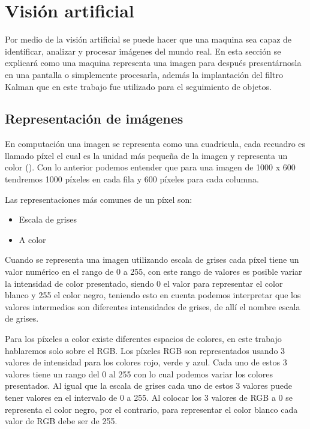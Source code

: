 \section{Visión artificial}

Por medio de la visión artificial se puede hacer que una maquina sea capaz de identificar, analizar y procesar imágenes del mundo real. En esta sección se explicará como una maquina representa una imagen para después presentárnosla en una pantalla o simplemente procesarla, además la implantación del filtro Kalman que en este trabajo fue utilizado para el seguimiento de objetos.

\subsection{Representación de imágenes}

En computación una imagen se representa como una cuadricula, cada recuadro es llamado píxel el cual es la unidad más pequeña de la imagen y representa un color (\cite{rosebrock2017deep}). Con lo anterior podemos entender que para una imagen de 1000 x 600 tendremos 1000 píxeles en cada fila y 600 píxeles para cada columna.

Las representaciones más comunes de un píxel son:

\begin{itemize}
\item Escala de grises
\item A color
\end{itemize}


Cuando se representa una imagen utilizando escala de grises cada píxel tiene un valor numérico en el rango de 0 a 255, con este rango de valores es posible variar la intensidad de color presentado, siendo 0 el valor para representar el color blanco y 255 el color negro, teniendo esto en cuenta podemos interpretar que los valores intermedios son diferentes intensidades de grises, de allí el nombre escala de grises.

Para los píxeles a color existe diferentes espacios de colores, en este trabajo hablaremos solo sobre el RGB. Los píxeles RGB son representados usando 3 valores de intensidad para los colores rojo, verde y azul. Cada uno de estos 3 valores tiene un rango del 0 al 255 con lo cual podemos variar los colores presentados. Al igual que la escala de grises cada uno de estos 3 valores puede tener valores en el intervalo de 0 a 255. Al colocar los 3 valores de RGB a 0 se representa el color negro, por el contrario, para representar el color blanco cada valor de RGB debe ser de 255.

